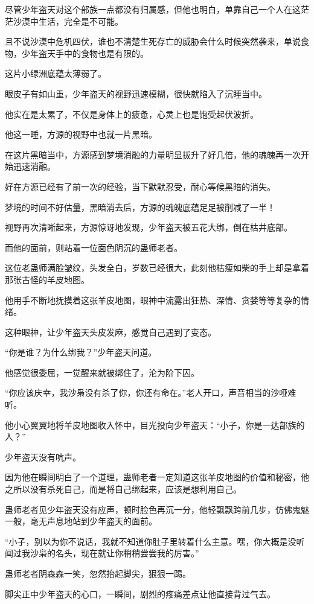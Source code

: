\begin{this_body}
尽管少年盗天对这个部族一点都没有归属感，但他也明白，单靠自己一个人在这茫茫沙漠中生活，完全是不可能。

且不说沙漠中危机四伏，谁也不清楚生死存亡的威胁会什么时候突然袭来，单说食物，少年盗天手中的食物也是有限的。

这片小绿洲底蕴太薄弱了。

眼皮子有如山重，少年盗天的视野迅速模糊，很快就陷入了沉睡当中。

他实在是太累了，不仅是身体上的疲惫，心灵上也是饱受起伏波折。

他这一睡，方源的视野中也就一片黑暗。

在这片黑暗当中，方源感到梦境消融的力量明显拔升了好几倍，他的魂魄再一次开始迅速消融。

好在方源已经有了前一次的经验，当下默默忍受，耐心等候黑暗的消失。

梦境的时间不好估量，黑暗消去后，方源的魂魄底蕴足足被削减了一半！

视野再次清晰起来，方源惊讶地发现，少年盗天被五花大绑，倒在枯井底部。

而他的面前，则站着一位面色阴沉的蛊师老者。

这位老蛊师满脸皱纹，头发全白，岁数已经很大，此刻他枯瘦如柴的手上却是拿着那张古怪的羊皮地图。

他用手不断地抚摸着这张羊皮地图，眼神中流露出狂热、深情、贪婪等等复杂的情绪。

这种眼神，让少年盗天头皮发麻，感觉自己遇到了变态。

“你是谁？为什么绑我？”少年盗天问道。

他感觉很委屈，一觉醒来就被绑住了，沦为阶下囚。

“你应该庆幸，我沙枭没有杀了你，你还有命在。”老人开口，声音相当的沙哑难听。

他小心翼翼地将羊皮地图收入怀中，目光投向少年盗天：“小子，你是一达部族的人？”

少年盗天没有吭声。

因为他在瞬间明白了一个道理，蛊师老者一定知道这张羊皮地图的价值和秘密，他之所以没有杀死自己，而是将自己绑起来，应该是想利用自己。

蛊师老者见少年盗天没有应声，顿时脸色再沉一分，他轻飘飘跨前几步，仿佛鬼魅一般，毫无声息地站到少年盗天的面前。

“小子，别以为你不说话，我就不知道你肚子里转着什么主意。嘿，你大概是没听闻过我沙枭的名头，现在就让你稍稍尝尝我的厉害。”

蛊师老者阴森森一笑，忽然抬起脚尖，狠狠一踢。

脚尖正中少年盗天的心口，一瞬间，剧烈的疼痛差点让他直接背过气去。


\end{this_body}
